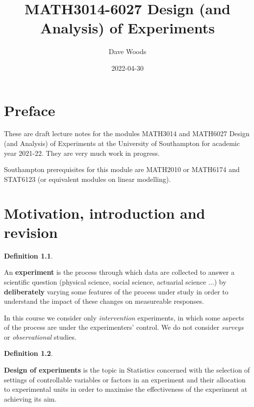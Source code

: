 \documentclass[
]{book}
\title{MATH3014-6027 Design (and Analysis) of Experiments}
\author{Dave Woods}
\date{2022-04-30}
\theoremstyle{definition}
\newtheorem{definition}{Definition}[chapter]
\theoremstyle{definition}
\theoremstyle{definition}
\theoremstyle{definition}
\theoremstyle{remark}
\begin{document}
\maketitle

{
\setcounter{tocdepth}{1}
\tableofcontents
}
\hypertarget{preface}{%
\chapter*{Preface}\label{preface}}

These are draft lecture notes for the modules MATH3014 and MATH6027 Design (and Analysis) of Experiments at the University of Southampton for academic year 2021-22. They are very much work in progress.

Southampton prerequisites for this module are MATH2010 or MATH6174 and STAT6123 (or equivalent modules on linear modelling).

\newcommand{\bx}{\boldsymbol{x}}
\newcommand{\btheta}{\boldsymbol{\theta}}
\newcommand{\bbeta}{\boldsymbol{\beta}}
\newcommand{\bvarepsilon}{\boldsymbol{\varepsilon}}
\newcommand{\by}{\boldsymbol{y}}
\newcommand{\rT}{\mathrm{T}}
\newcommand{\Var}{\operatorname{Var}}
\newcommand{\bY}{\boldsymbol{y}}
\newcommand{\btau}{\boldsymbol{\tau}}

\hypertarget{intro}{%
\chapter{Motivation, introduction and revision}\label{intro}}

\begin{definition}
\protect\hypertarget{def:exp}{}\label{def:exp}

An \textbf{experiment} is the process through which data are collected to answer a scientific question (physical science, social science, actuarial science \(\dots\)) by \textbf{deliberately} varying some features of the process under study in order to understand the impact of these changes on measureable responses.

In this course we consider only \emph{intervention} experiments, in which some aspects of the process are under the experimenters' control. We do not consider \emph{surveys} or \emph{observational} studies.

\end{definition}

\begin{definition}
\protect\hypertarget{def:design}{}\label{def:design}

\textbf{Design of experiments} is the topic in Statistics concerned with the selection of settings of controllable variables or factors in an experiment and their allocation to experimental units in order to maximise the effectiveness of the experiment at achieving its aim.

\end{definition}
\end{document}
